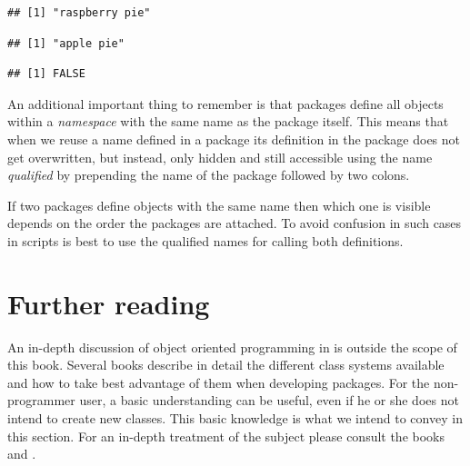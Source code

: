 \documentclass[krantz2]{krantz}\usepackage{knitr}%
\begin{document}
\begin{knitrout}\footnotesize
{}\color{fgcolor}\begin{kframe}
\begin{alltt}
 \hlkwb{<-} 
\end{alltt}
\begin{verbatim}
## [1] "raspberry pie"
\end{verbatim}
\begin{alltt}
 \hlkwb{<-} 
\end{alltt}
\begin{verbatim}
## [1] "apple pie"
\end{verbatim}
\begin{alltt}
\hlstd{(}\hlstd{)}
\end{alltt}
\begin{verbatim}
## [1] FALSE
\end{verbatim}
\end{kframe}
\end{knitrout}

An additional important thing to remember is that \Rlang packages define all objects within a \emph{namespace} with the same name as the package itself. This means that when we reuse a name defined in a package its definition in the package does not get overwritten, but instead, only hidden and still accessible using the name \emph{qualified} by prepending the name of the package followed by two colons.

If two packages define objects with the same name then which one is visible depends on the order the packages are attached. To avoid confusion in such cases in scripts is best to use the qualified names for calling both definitions.

\section{Further reading}

An in-depth discussion of object oriented programming in \Rlang is outside the scope of this book. Several books describe in detail the different class systems available and how to take best advantage of them when developing \Rlang packages. For the non-programmer user, a basic understanding can be useful, even if he or she does not intend to create new classes. This basic knowledge is what we intend to convey in this section. For an in-depth treatment of the subject please consult the books  \autocite{Wickham2019} and  \autocite{Chambers2016}.
\end{document}

